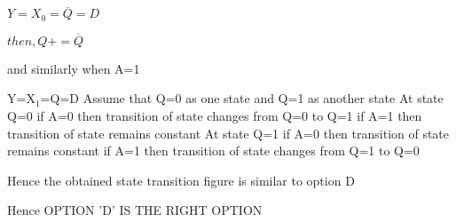 \documentclass[standalone]{article}
\begin{document}
    $ Y=X_0=\overline{Q}=D$
     
    $ then,Q+  =\overline{Q}$
    
    and  similarly  when  A=1
    
    Y=X$_1$=Q=D
   Assume   that  Q=0  as one  state and Q=1  as another state
   At  state Q=0
    if  A=0
    then transition of state changes from Q=0 to Q=1
    if A=1
    then transition of state remains constant
   At  state  Q=1
    if  A=0
    then transition of state remains constant
    if A=1
    then transition of state changes from Q=1 to Q=0
    
    Hence the obtained state transition figure is similar to option D
    
    Hence  OPTION 'D' IS THE RIGHT OPTION
    
\begin{figure}[h]
    \centering
     
\end{figure}
\end{document}

